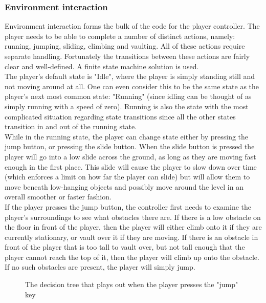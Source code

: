 \documentclass[11pt,a4paper]{article}
\begin{document}
\subsubsection{Environment interaction}
Environment interaction forms the bulk of the code for the player controller. The player needs to be able to complete a number of distinct actions, namely: running, jumping, sliding, climbing and vaulting. All of these actions require separate handling. Fortunately the transitions between these actions are fairly clear and well-defined. A finite state machine solution is used. \\
The player's default state is "Idle", where the player is simply standing still and not moving around at all. One can even consider this to be the same state as the player's next most common state: "Running" (since idling can be thought of as simply running with a speed of zero). Running is also the state with the most complicated situation regarding state transitions since all the other states transition in and out of  the running state. \\
While in the running state, the player can change state either by pressing the jump button, or pressing the slide button. When the slide button is pressed the player will go into a low slide across the ground, as long as they are moving fast enough in the first place. This slide will cause the player to slow down over time (which enforces a limit on how far the player can slide) but will allow them to move beneath low-hanging objects and possibly move around the level in an overall smoother or faster fashion. \\
If the player presses the jump button, the controller first needs to examine the player's surroundings to see what obstacles there are. If there is a low obstacle on the floor in front of the player, then the player will either climb onto it if they are currently stationary, or vault over it if they are moving. If there is an obstacle in front of the player that is too tall to vault over, but not tall enough that the player cannot reach the top of it, then the player will climb up onto the obstacle. If no such obstacles are present, the player will simply jump.
\begin{figure}[H]
    \caption{The decision tree that plays out when the player presses the "jump" key}
    \label{fig:jumpDecisionTree}
\end{figure}
\end{document}
